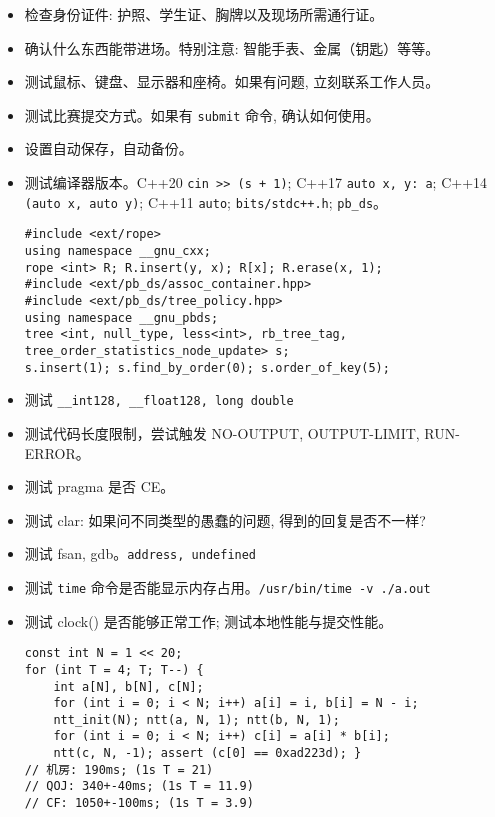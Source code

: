 \begin{small}
\begin{itemize}[leftmargin=1mm]
    \setlength{\itemsep}{0pt}
    \setlength{\parskip}{0.5pt}
    \item 检查身份证件: 护照、学生证、胸牌以及现场所需通行证。
    \item 确认什么东西能带进场。特别注意: 智能手表、金属（钥匙）等等。
    \item 测试鼠标、键盘、显示器和座椅。如果有问题, 立刻联系工作人员。
    \item 测试比赛提交方式。如果有 \texttt{submit} 命令, 确认如何使用。
    \item 设置自动保存，自动备份。
    \item 测试编译器版本。C++20 \texttt{cin >> (s + 1)}; C++17 \texttt{auto \lbrack x, y\rbrack : a}; C++14 \texttt{\lbrack \rbrack (auto x, auto y)}; C++11 \texttt{auto}; \texttt{bits/stdc++.h}; \texttt{pb\_ds}。
\begin{verbatim}
#include <ext/rope>
using namespace __gnu_cxx;
rope <int> R; R.insert(y, x); R[x]; R.erase(x, 1);
#include <ext/pb_ds/assoc_container.hpp> 
#include <ext/pb_ds/tree_policy.hpp> 
using namespace __gnu_pbds;
tree <int, null_type, less<int>, rb_tree_tag,
tree_order_statistics_node_update> s;
s.insert(1); s.find_by_order(0); s.order_of_key(5);
\end{verbatim}
    \item 测试 \texttt{\_\_int128, \_\_float128, long double}
    \item 测试代码长度限制，尝试触发 NO-OUTPUT, OUTPUT-LIMIT, RUN-ERROR。
    \item 测试 pragma 是否 CE。
    \item 测试 clar: 如果问不同类型的愚蠢的问题, 得到的回复是否不一样? 
    \item 测试 fsan, gdb。\texttt{address, undefined}
    \item 测试 \texttt{time} 命令是否能显示内存占用。\texttt{/usr/bin/time -v ./a.out}
    \item 测试 clock() 是否能够正常工作; 测试本地性能与提交性能。
\begin{verbatim}
const int N = 1 << 20;
for (int T = 4; T; T--) {
    int a[N], b[N], c[N];
    for (int i = 0; i < N; i++) a[i] = i, b[i] = N - i;
    ntt_init(N); ntt(a, N, 1); ntt(b, N, 1);
    for (int i = 0; i < N; i++) c[i] = a[i] * b[i];
    ntt(c, N, -1); assert (c[0] == 0xad223d); }
// 机房: 190ms; (1s T = 21)
// QOJ: 340+-40ms; (1s T = 11.9)
// CF: 1050+-100ms; (1s T = 3.9)
\end{verbatim}

\end{itemize}
\end{small}
